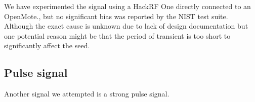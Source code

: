 We have experimented the signal using a HackRF One\cite{HackRFOne} directly connected to an OpenMote\cite{OpenMote}., but no significant bias was reported by the NIST test suite. Although the exact cause is unknown due to lack of design documentation but one potential reason might be that the period of transient is too short to significantly affect the seed.

\subsection{Pulse signal} \label{Pulse}
Another signal we attempted is a strong pulse signal.

